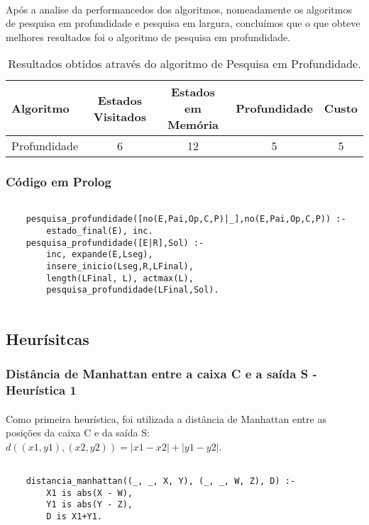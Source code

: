 \documentclass{article}
\begin{document}
\paragraph{} Após a analise da performancedos dos algoritmos, nomeadamente os algoritmos de pesquisa em profundidade e pesquisa em largura, concluímos que o que obteve melhores resultados foi o algoritmo de pesquisa em profundidade.
\begin{table}[h]
\centering
\begin{tabular}{l|c|c|c|c}
Algoritmo & Estados Visitados & Estados em Memória & Profundidade & Custo \\\hline
Profundidade & 6 & 12 & 5 & 5  
\end{tabular}
\caption{\label{tab:pni}Resultados obtidos através do algoritmo de Pesquisa em Profundidade.}
\end{table}

\subsubsection{Código em Prolog}
\begin{verbatim}

    pesquisa_profundidade([no(E,Pai,Op,C,P)|_],no(E,Pai,Op,C,P)) :- 
        estado_final(E), inc.
    pesquisa_profundidade([E|R],Sol) :- 
        inc, expande(E,Lseg),
        insere_inicio(Lseg,R,LFinal),
        length(LFinal, L), actmax(L),
        pesquisa_profundidade(LFinal,Sol).
        
\end{verbatim}

\subsection{Heurísitcas}
\subsubsection{Distância de Manhattan entre a caixa C e a saída S - Heurística 1}
\paragraph{} Como primeira heurística, foi utilizada a distância de Manhattan entre as posições da caixa C e da saída S: $d((x1, y1), (x2, y2)) = |x1 - x2| + |y1 - y2|$.

\begin{verbatim}

    distancia_manhattan((_, _, X, Y), (_, _, W, Z), D) :-
        X1 is abs(X - W),
        Y1 is abs(Y - Z),
        D is X1+Y1.
        
\end{verbatim}
\end{document}
